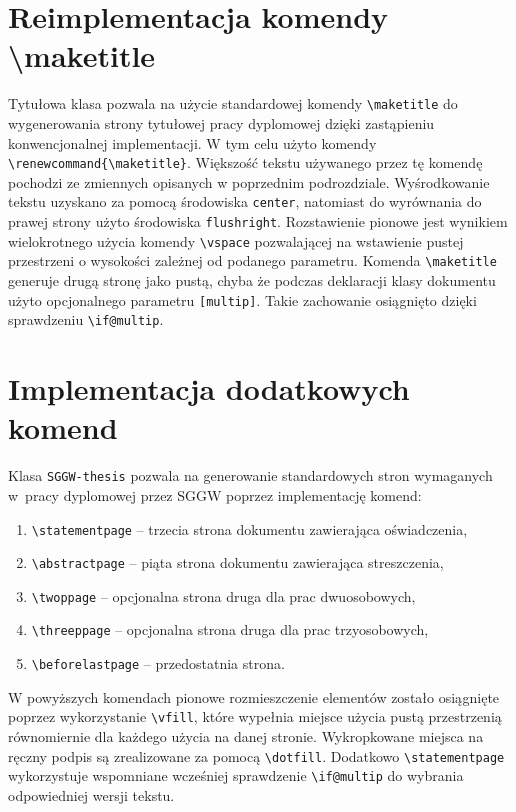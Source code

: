 \documentclass{SGGW-thesis}
\begin{document}
\section{Reimplementacja komendy \textbackslash maketitle}
\label{sec:maketitle}
Tytułowa klasa pozwala na użycie standardowej komendy \verb|\maketitle| do wygenerowania strony tytułowej pracy dyplomowej dzięki zastąpieniu konwencjonalnej implementacji.
W tym celu użyto komendy \verb|\renewcommand{\maketitle}|.
Większość tekstu używanego przez tę komendę pochodzi ze zmiennych opisanych w poprzednim podrozdziale. Wyśrodkowanie tekstu uzyskano za pomocą środowiska \verb|center|,
natomiast do wyrównania do prawej strony użyto środowiska \verb|flushright|. Rozstawienie pionowe jest wynikiem wielokrotnego użycia komendy \verb|\vspace| pozwalającej na
wstawienie pustej przestrzeni o wysokości zależnej od podanego parametru. Komenda \verb|\maketitle| generuje drugą stronę jako pustą, chyba że podczas deklaracji klasy
dokumentu użyto opcjonalnego parametru \verb|[multip]|. Takie zachowanie osiągnięto dzięki sprawdzeniu \verb|\if@multip|.


\section{Implementacja dodatkowych komend}
\label{sec:implementacja-dodatkowych}
Klasa {\tt SGGW-thesis} pozwala na generowanie standardowych stron wymaganych w~pracy dyplomowej przez SGGW poprzez implementację komend:
\begin{enumerate}[label=\alph*.,itemsep=0pt]
\item{\verb|\statementpage| -- trzecia strona dokumentu zawierająca oświadczenia,}
\item{\verb|\abstractpage| -- piąta strona dokumentu zawierająca streszczenia,}
\item{\verb|\twoppage| -- opcjonalna strona druga dla prac dwuosobowych,}
\item{\verb|\threeppage| -- opcjonalna strona druga dla prac trzyosobowych,}
\item{\verb|\beforelastpage| -- przedostatnia strona.}
\end{enumerate}
W powyższych komendach pionowe rozmieszczenie elementów zostało osiągnięte poprzez wykorzystanie \verb|\vfill|, które wypełnia miejsce użycia pustą przestrzenią równomiernie
dla każdego użycia na danej stronie. Wykropkowane miejsca na ręczny podpis są zrealizowane za pomocą \verb|\dotfill|. Dodatkowo \verb|\statementpage| wykorzystuje wspomniane
wcześniej sprawdzenie \verb|\if@multip| do wybrania odpowiedniej wersji tekstu.
\end{document}
